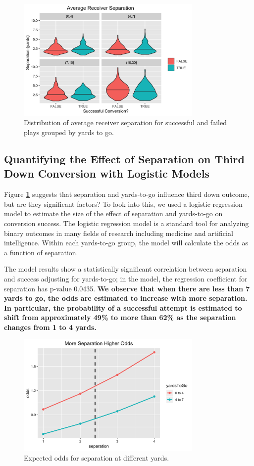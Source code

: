 \documentclass[12pt,letterpaper]{article}
\begin{document}
\begin{figure}[h!]
\centering
\includegraphics[width=0.8\textwidth]{mean_separation.png}
\caption{Distribution of average receiver separation for successful and failed plays grouped by yards to go.}
\label{fig:violin}
\end{figure}

\subsection*{Quantifying the Effect of Separation on Third Down Conversion with Logistic Models}

Figure \textbf{\ref{fig:violin}} suggests that separation and yards-to-go influence third down outcome, but are they significant factors? To look into this, we used a logistic regression model to estimate the size of the effect of separation and yards-to-go on conversion success. The logistic regression model is a standard tool for analyzing binary outcomes in many fields of research including medicine and artificial intelligence. Within each yards-to-go group, the model will calculate the odds as a function of separation.

The model results show a statistically significant correlation between separation and success adjusting for yards-to-go; in the model, the regression coefficient for separation has p-value 0.0435. \textbf{We observe that when there are less than 7 yards to go, the odds are estimated to increase with more separation. In particular, the probability of a successful attempt is estimated to shift from approximately 49\% to more than 62\% as the separation changes from 1 to 4 yards.} 

\begin{figure}[h!]
\centering
\includegraphics[width=0.8\textwidth]{odds_separation.png}
\caption{Expected odds for separation at different yards.}
\end{figure}
\end{document}

